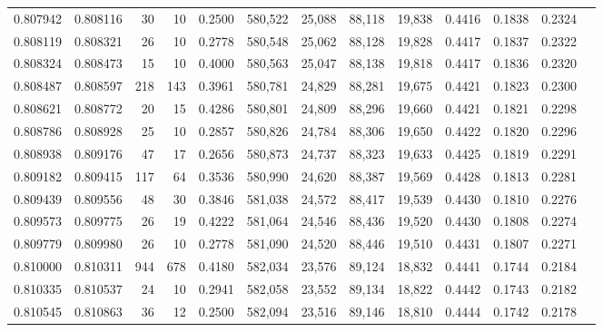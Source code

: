 \begin{tabular}{rrrrrrrrrrrrr}
0.807942 & 0.808116 &    30 &  10 &                                     0.2500 & 580,522 &  25,088 &  88,118 &  19,838 & 0.4416 & 0.1838 & 0.2324 \\
0.808119 & 0.808321 &    26 &  10 &                                     0.2778 & 580,548 &  25,062 &  88,128 &  19,828 & 0.4417 & 0.1837 & 0.2322 \\
0.808324 & 0.808473 &    15 &  10 &                                     0.4000 & 580,563 &  25,047 &  88,138 &  19,818 & 0.4417 & 0.1836 & 0.2320 \\
0.808487 & 0.808597 &   218 & 143 &                                     0.3961 & 580,781 &  24,829 &  88,281 &  19,675 & 0.4421 & 0.1823 & 0.2300 \\
0.808621 & 0.808772 &    20 &  15 &                                     0.4286 & 580,801 &  24,809 &  88,296 &  19,660 & 0.4421 & 0.1821 & 0.2298 \\
0.808786 & 0.808928 &    25 &  10 &                                     0.2857 & 580,826 &  24,784 &  88,306 &  19,650 & 0.4422 & 0.1820 & 0.2296 \\
0.808938 & 0.809176 &    47 &  17 &                                     0.2656 & 580,873 &  24,737 &  88,323 &  19,633 & 0.4425 & 0.1819 & 0.2291 \\
0.809182 & 0.809415 &   117 &  64 &                                     0.3536 & 580,990 &  24,620 &  88,387 &  19,569 & 0.4428 & 0.1813 & 0.2281 \\
0.809439 & 0.809556 &    48 &  30 &                                     0.3846 & 581,038 &  24,572 &  88,417 &  19,539 & 0.4430 & 0.1810 & 0.2276 \\
0.809573 & 0.809775 &    26 &  19 &                                     0.4222 & 581,064 &  24,546 &  88,436 &  19,520 & 0.4430 & 0.1808 & 0.2274 \\
0.809779 & 0.809980 &    26 &  10 &                                     0.2778 & 581,090 &  24,520 &  88,446 &  19,510 & 0.4431 & 0.1807 & 0.2271 \\
0.810000 & 0.810311 &   944 & 678 &                                     0.4180 & 582,034 &  23,576 &  89,124 &  18,832 & 0.4441 & 0.1744 & 0.2184 \\
0.810335 & 0.810537 &    24 &  10 &                                     0.2941 & 582,058 &  23,552 &  89,134 &  18,822 & 0.4442 & 0.1743 & 0.2182 \\
0.810545 & 0.810863 &    36 &  12 &                                     0.2500 & 582,094 &  23,516 &  89,146 &  18,810 & 0.4444 & 0.1742 & 0.2178 \\

\end{tabular}
